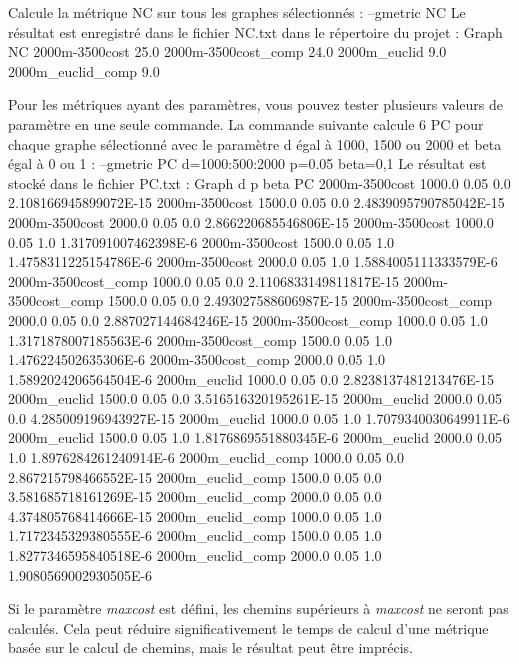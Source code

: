 \documentclass[a4paper,10pt]{report}
\newenvironment{cmd}
{\quote\Verbatim}
{\endVerbatim\endquote}
\begin{document}
Calcule la métrique NC sur tous les graphes sélectionnés :
\begin{cmd}
--gmetric NC
\end{cmd}
Le résultat est enregistré dans le fichier NC.txt dans le répertoire du projet :
\begin{cmd}
Graph                NC
2000m-3500cost       25.0
2000m-3500cost_comp  24.0
2000m_euclid         9.0
2000m_euclid_comp    9.0
\end{cmd}

Pour les métriques ayant des paramètres, vous pouvez tester plusieurs valeurs de paramètre en une seule commande.
La commande suivante calcule 6 PC pour chaque graphe sélectionné avec le paramètre d égal à 1000, 1500 ou 2000 et beta égal à 0 ou 1 :
\begin{cmd}
--gmetric PC d=1000:500:2000 p=0.05 beta=0,1
\end{cmd}
Le résultat est stocké dans le fichier PC.txt :
\begin{cmd}
Graph               d     	p   	beta	PC
2000m-3500cost      1000.0	0.05	0.0	2.108166945899072E-15
2000m-3500cost      1500.0	0.05	0.0	2.4839095790785042E-15
2000m-3500cost      2000.0	0.05	0.0	2.866220685546806E-15
2000m-3500cost      1000.0	0.05	1.0	1.317091007462398E-6
2000m-3500cost      1500.0	0.05	1.0	1.4758311225154786E-6
2000m-3500cost      2000.0	0.05	1.0	1.5884005111333579E-6
2000m-3500cost_comp 1000.0	0.05	0.0	2.1106833149811817E-15
2000m-3500cost_comp 1500.0	0.05	0.0	2.493027588606987E-15
2000m-3500cost_comp 2000.0	0.05	0.0	2.887027144684246E-15
2000m-3500cost_comp 1000.0	0.05	1.0	1.3171878007185563E-6
2000m-3500cost_comp 1500.0	0.05	1.0	1.476224502635306E-6
2000m-3500cost_comp 2000.0	0.05	1.0	1.5892024206564504E-6
2000m_euclid        1000.0	0.05	0.0	2.8238137481213476E-15
2000m_euclid        1500.0	0.05	0.0	3.516516320195261E-15
2000m_euclid        2000.0	0.05	0.0	4.285009196943927E-15
2000m_euclid        1000.0	0.05	1.0	1.7079340030649911E-6
2000m_euclid        1500.0	0.05	1.0	1.8176869551880345E-6
2000m_euclid        2000.0	0.05	1.0	1.8976284261240914E-6
2000m_euclid_comp   1000.0	0.05	0.0	2.867215798466552E-15
2000m_euclid_comp   1500.0	0.05	0.0	3.581685718161269E-15
2000m_euclid_comp   2000.0	0.05	0.0	4.374805768414666E-15
2000m_euclid_comp   1000.0	0.05	1.0	1.7172345329380555E-6
2000m_euclid_comp   1500.0	0.05	1.0	1.8277346595840518E-6
2000m_euclid_comp   2000.0	0.05	1.0	1.9080569002930505E-6
\end{cmd}

Si le paramètre \textit{maxcost} est défini, les chemins supérieurs à \textit{maxcost} ne seront pas calculés. 
Cela peut réduire significativement le temps de calcul d'une métrique basée sur le calcul de chemins, mais le résultat peut être imprécis.
\end{document}
